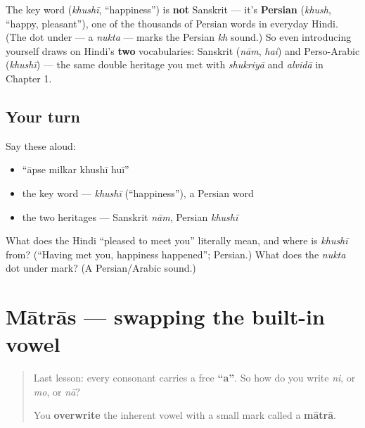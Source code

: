 \begin{cousinweb}
The key word \textbf{} (\emph{khushī}, \textquotedblleft{}happiness\textquotedblright{}) is \textbf{not} Sanskrit — it's \textbf{Persian} (\emph{khush}, \textquotedblleft{}happy, pleasant\textquotedblright{}), one of the thousands of Persian words in everyday Hindi. (The dot under \textbf{} — a \emph{nukta} — marks the Persian \emph{kh} sound.) So even introducing yourself draws on Hindi's \textbf{two} vocabularies: Sanskrit (\emph{nām}, \emph{hai}) and Perso-Arabic (\emph{khushī}) — the same double heritage you met with \emph{shukriyā} and \emph{alvidā} in Chapter 1.
\end{cousinweb}

\subsection*{Your turn}
Say these aloud:

\begin{itemize}
\raggedright
  \item \textquotedblleft{}āpse milkar khushī huī\textquotedblright{}
  \item the key word — \emph{khushī} (\textquotedblleft{}happiness\textquotedblright{}), a Persian word
  \item the two heritages — Sanskrit \emph{nām}, Persian \emph{khushī}
\end{itemize}

\begin{tcolorbox}[breakable,colback=teal!4,colframe=teal!35!black,title={Before you move on}]
What does the Hindi \textquotedblleft{}pleased to meet you\textquotedblright{} literally mean, and where is \emph{khushī} from? (\textquotedblleft{}Having met you, happiness happened\textquotedblright{}; Persian.) What does the \emph{nukta} dot under  mark? (A Persian/Arabic sound.)
\end{tcolorbox}
\section[\texorpdfstring{\hi{ा}, \hi{े} / \hi{मात्रा} (ā, e / mātrā)}{ा, े / मात्रा (ā, e / mātrā)}]{Mātrās — swapping the built-in vowel}

\label{lesson:HI-W03-matras-naam}



\begin{quote}
Last lesson: every consonant carries a free \textbf{\textquotedblleft{}a\textquotedblright{}}. So how do you write \emph{ni}, or \emph{mo}, or \emph{nā}?

You \textbf{overwrite} the inherent vowel with a small mark called a \textbf{mātrā}.
\end{quote}

